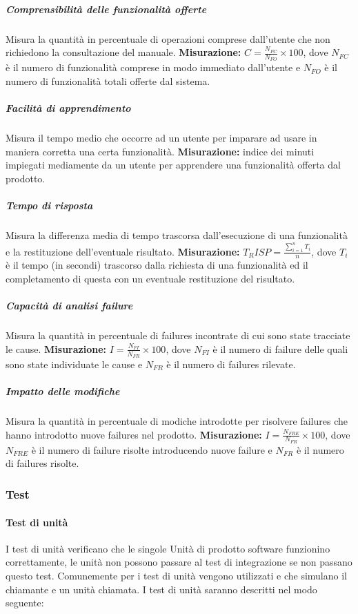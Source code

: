 \subparagraph{Comprensibilità delle funzionalità offerte} \Spazio 
Misura la quantità in percentuale di operazioni comprese dall'utente che non richiedono la consultazione del manuale.
\textbf{Misurazione:} $C=\frac{N_{FC}}{N_{FO}}\times 100$, dove $N_{FC}$ è il numero di funzionalità comprese in modo immediato dall'utente e $N_{FO}$ è il numero di funzionalità totali offerte dal sistema.
 
\subparagraph{Facilità di apprendimento} \Spazio 
Misura il tempo medio che occorre ad un utente per imparare ad usare in maniera corretta una certa funzionalità.
\textbf{Misurazione:} indice dei minuti impiegati mediamente da un utente per apprendere una funzionalità offerta dal prodotto.

\subparagraph{Tempo di risposta} \Spazio
Misura la differenza media di tempo trascorsa dall’esecuzione di una funzionalità e la restituzione dell’eventuale risultato.
\textbf{Misurazione:} $T_RISP=\frac{\sum\limits_{i=1}^n {T_i }}{n}$, dove $T_i$ è il tempo (in secondi) trascorso dalla richiesta di una funzionalità ed il completamento di questa con un eventuale restituzione del risultato.

\subparagraph{Capacità di analisi failure} \Spazio
Misura la quantità in percentuale di failures incontrate di cui sono state tracciate le cause.
\textbf{Misurazione:} $I=\frac{N_{FI}}{N_{FR}}\times 100 $, dove $N_{FI}$ è il numero di failure delle quali sono state individuate le cause e $N_{FR}$ è il numero di failures rilevate.

\subparagraph{Impatto delle modifiche} \Spazio
Misura la quantità in percentuale di modiche introdotte per risolvere failures che hanno introdotto nuove failures nel prodotto.
\textbf{Misurazione:} $I=\frac{N_{FRE}}{N_{FR}}\times 100 $, dove $N_{FRE}$ è il numero di failure risolte introducendo nuove failure e $N_{FR}$ è il numero di failures risolte. 
	
\subsubsection{Test}
\paragraph{Test di unità} \Spazio
I test di unità verificano che le singole Unità di prodotto software funzionino correttamente, le unità non possono passare al test di integrazione se non passano questo test.
Comunemente per i test di unità vengono utilizzati  e  che simulano il chiamante e un unità chiamata.\newline
I test di unità saranno descritti nel modo seguente: \Spazio

